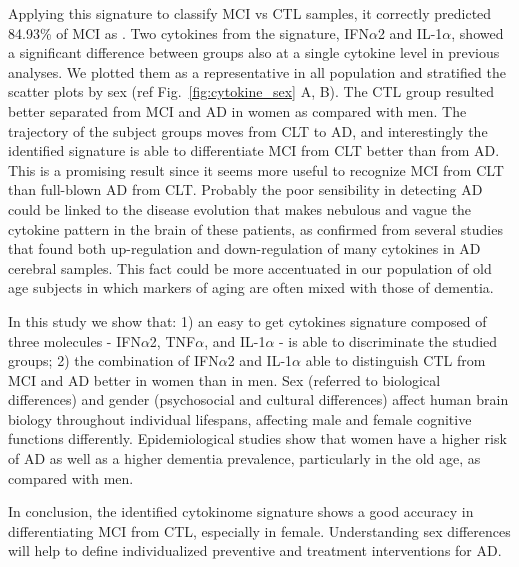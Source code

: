 \documentclass{standalone}
\begin{document}
Applying this signature to classify MCI vs CTL samples, it correctly predicted 84.93\% of MCI as .
Two cytokines from the signature, IFN$\alpha$2 and IL-1$\alpha$, showed a significant difference between groups also at a single cytokine level in previous analyses.
We plotted them as a representative in all population and stratified the scatter plots by sex (ref Fig.~\ref{fig:cytokine_sex} A, B).
The CTL group resulted better separated from MCI and AD in women as compared with men.
The trajectory of the subject groups moves from CLT to AD, and interestingly the identified signature is able to differentiate MCI from CLT better than from AD.
This is a promising result since it seems more useful to recognize MCI from CLT than full-blown AD from CLT.
Probably the poor sensibility in detecting AD could be linked to the disease evolution that makes nebulous and vague the cytokine pattern in the brain of these patients, as confirmed from several studies that found both up-regulation and down-regulation of many cytokines in AD cerebral samples.
This fact could be more accentuated in our population of old age subjects in which markers of aging are often mixed with those of dementia.

In this study we show that: 1) an easy to get cytokines signature composed of three molecules - IFN$\alpha$2, TNF$\alpha$, and IL-1$\alpha$ - is able to discriminate the studied groups; 2) the combination of IFN$\alpha$2 and IL-1$\alpha$ able to distinguish CTL from MCI and AD better in women than in men.
Sex (referred to biological differences) and gender (psychosocial and cultural differences) affect human brain biology throughout individual lifespans, affecting male and female cognitive functions differently.
Epidemiological studies show that women have a higher risk of AD as well as a higher dementia prevalence, particularly in the old age, as compared with men.

In conclusion, the identified cytokinome signature shows a good accuracy in differentiating MCI from CTL, especially in female.
Understanding sex differences will help to define individualized preventive and treatment interventions for AD.
\end{document}
